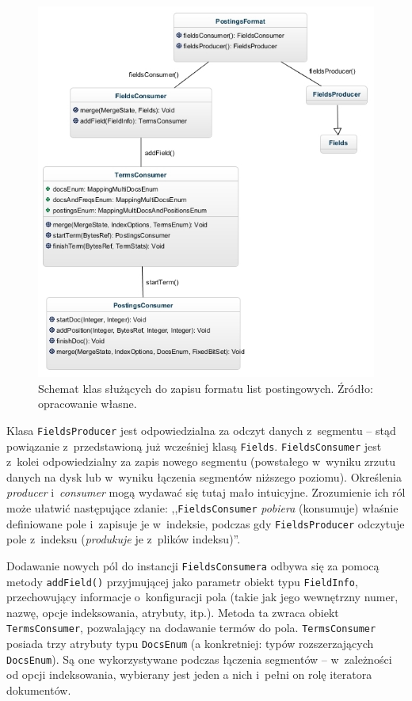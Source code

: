 \begin{figure}[p]
 \includegraphics[scale=0.65]{pictures/PostingsFormat_1.jpg}
 \caption{Schemat klas służących do zapisu formatu list postingowych. Źródło: opracowanie własne.\label{fig:postingFormat}}
\end{figure}

Klasa \texttt{FieldsProducer} jest odpowiedzialna za odczyt danych z~segmentu -- stąd powiązanie z~przedstawioną już wcześniej klasą \texttt{Fields}. \texttt{FieldsConsumer} jest z~kolei odpowiedzialny za zapis nowego segmentu (powstałego w~wyniku zrzutu danych na dysk lub w~wyniku łączenia segmentów niższego poziomu). Określenia \emph{producer} i~\emph{consumer} mogą wydawać się tutaj mało intuicyjne. Zrozumienie ich ról może ułatwić następujące zdanie: ,,\texttt{FieldsConsumer} \emph{pobiera} (konsumuje) właśnie definiowane pole i~zapisuje je w~indeksie, podczas gdy \texttt{FieldsProducer} odczytuje pole z~indeksu (\emph{produkuje} je z~plików indeksu)''.

Dodawanie nowych pól do instancji \texttt{FieldsConsumera} odbywa się za pomocą metody \texttt{addField()} przyjmującej jako parametr obiekt typu \texttt{FieldInfo}, przechowujący informacje o~konfiguracji pola (takie jak jego wewnętrzny numer, nazwę, opcje indeksowania, atrybuty, itp.). Metoda ta zwraca obiekt \texttt{TermsConsumer}, pozwalający na dodawanie termów do pola. \texttt{TermsConsumer} posiada trzy atrybuty typu \texttt{DocsEnum} (a konkretniej: typów rozszerzających \texttt{DocsEnum}). Są one wykorzystywane podczas łączenia segmentów -- w~zależności od opcji indeksowania, wybierany jest jeden a nich i~pełni on rolę iteratora dokumentów.

